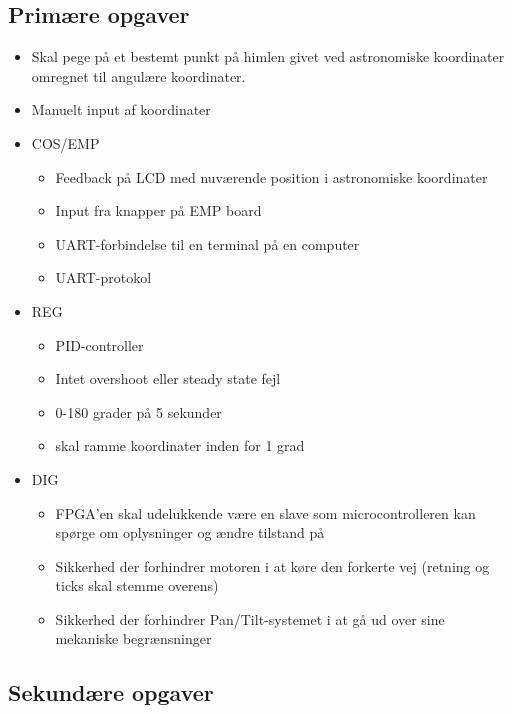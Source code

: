 \subsection{Primære opgaver}
	\begin{itemize}
	\item Skal pege på et bestemt punkt på himlen givet ved astronomiske koordinater omregnet til angulære koordinater.
	\item Manuelt input af koordinater
	
	\item COS/EMP
	\begin{itemize}[noitemsep]
	\item Feedback på LCD med nuværende position i astronomiske koordinater
	\item Input fra knapper på EMP board
	\item UART-forbindelse til en terminal på en computer
	\item UART-protokol
	\end{itemize}
	\item REG
	\begin{itemize}[noitemsep]
	\item PID-controller
	\item Intet overshoot eller steady state fejl
	\item 0-180 grader på 5 sekunder
	\item skal ramme koordinater inden for 1 grad
	\end{itemize}
	\item DIG
	\begin{itemize}[noitemsep]
	\item FPGA'en skal udelukkende være en slave som microcontrolleren kan spørge om oplysninger og ændre tilstand på
	\item Sikkerhed der forhindrer motoren i at køre den forkerte vej (retning og ticks skal stemme overens)
	\item Sikkerhed der forhindrer Pan/Tilt-systemet i at gå ud over sine mekaniske begrænsninger
	\end{itemize}		
	\end{itemize}

\subsection{Sekundære opgaver}

